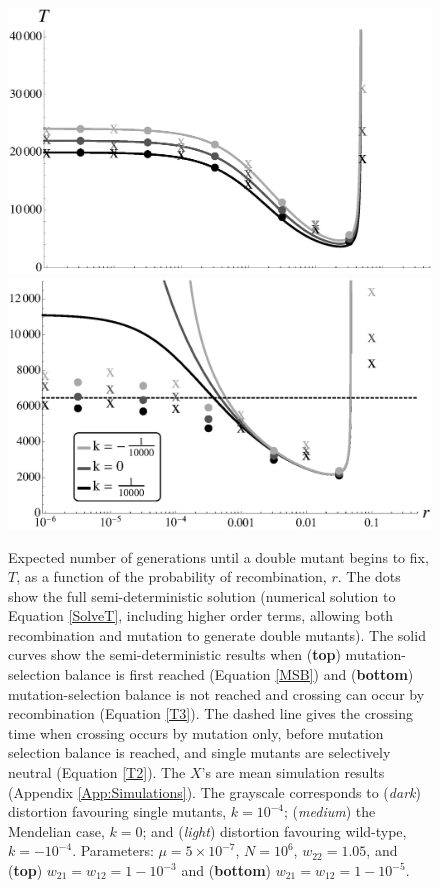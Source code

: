 \documentclass[review,3p,authoryear]{elsarticle}
\begin{document}
\begin{figure}[t]
\centering
\includegraphics[width=0.75\linewidth]{IMAGES/TimeFixDriveRMSBSimsBW.eps}
\includegraphics[width=0.75\linewidth]{IMAGES/TimeFixDriveRSimsBW.eps}
\caption{
Expected number of generations until a double mutant begins to fix, $T$, as a function of the probability of recombination, $r$.
The dots show the full semi-deterministic solution (numerical solution to Equation \ref{SolveT}, including higher order terms, allowing both recombination and mutation to generate double mutants).
The solid curves show the semi-deterministic results when (\textbf{top}) mutation-selection balance is first reached (Equation \ref{MSB}) and (\textbf{bottom}) mutation-selection balance is not reached and crossing can occur by recombination (Equation \ref{T3}).
The dashed line gives the crossing time when crossing occurs by mutation only, before mutation selection balance is reached, and single mutants are selectively neutral (Equation \ref{T2}).
The $X$'s are mean simulation results (Appendix \ref{App:Simulations}).
The grayscale corresponds to (\textit{dark}) distortion favouring single mutants, $k = 10^{-4}$; (\textit{medium}) the Mendelian case, $k = 0$; and (\textit{light}) distortion favouring wild-type, $k = -10^{-4}$.
Parameters: $\mu=5\times10^{-7}$, $N=10^6$, $w_{22}=1.05$, and (\textbf{top}) $w_{21}=w_{12}=1-10^{-3}$ and (\textbf{bottom}) $w_{21}=w_{12}=1-10^{-5}$. 
}
\label{TimeFixDriveR}
\end{figure}
\end{document}
